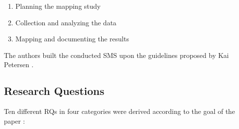 \begin{enumerate}
    \item Planning the mapping study
    \item Collection and analyzing the data
    \item Mapping and documenting the results
\end{enumerate}

The authors built the conducted SMS upon the guidelines proposed by Kai Petersen \cite{petersen:SMS}.

\subsection{Research Questions}

Ten different RQs in four categories were derived
according to the goal of the paper \cite{waseem:SMSMSADevOps}:

